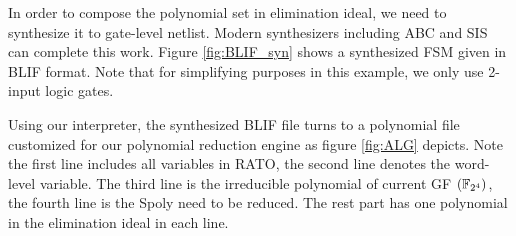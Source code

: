 \begin{Example}
In order to compose the polynomial set in elimination ideal, we need to synthesize it to 
gate-level netlist. Modern synthesizers including ABC \cite{brayton2010abc} and SIS \cite{SIS} 
can complete this work. Figure \ref{fig:BLIF_syn} shows a synthesized FSM given in 
BLIF format. Note that for simplifying purposes in this example, we only use 2-input logic gates.

\begin{figure}[hbt]
\end{figure}

Using our interpreter, the synthesized BLIF file turns to a polynomial file customized for our 
polynomial reduction engine as figure \ref{fig:ALG} depicts. Note the first line includes all variables in RATO, the second line 
denotes the word-level variable. The third line is the irreducible polynomial of current GF $({\mathbb{F}}_{2^4})$, the fourth line is the Spoly need to be reduced. The rest part has one polynomial in 
the elimination ideal in each line.


\end{Example}

